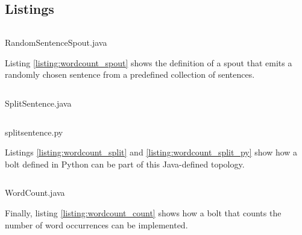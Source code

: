 \documentclass[bsc,logo,frontabs,twoside,singlespacing,normalheadings,parskip]{infthesis}\usepackage[]{graphicx}\usepackage[]{color}
\begin{document}
\begin{appendices}
\clearpage{}\chapter{Listings}
\label{ch:listings}

\begin{listing}[!htb]
\inputminted{java}{code/RandomSentenceSpout.java}
\caption{RandomSentenceSpout.java}
\label{listing:wordcount_spout}
\end{listing}

Listing \ref{listing:wordcount_spout} shows the definition of a spout that emits a randomly chosen sentence from a predefined collection of sentences.

\begin{listing}[!htb]
\inputminted{java}{code/SplitSentence.java}
\caption{SplitSentence.java}
\label{listing:wordcount_split}
\end{listing}

\begin{listing}[!htb]
\inputminted{python}{code/splitsentence.py}
\caption{splitsentence.py}
\label{listing:wordcount_split_py}
\end{listing}

Listings \ref{listing:wordcount_split} and \ref{listing:wordcount_split_py} show how a bolt defined in Python can be part of this Java-defined topology.

\begin{listing}[!htb]
\inputminted{java}{code/WordCount.java}
\caption{WordCount.java}
\label{listing:wordcount_count}
\end{listing}

Finally, listing \ref{listing:wordcount_count} shows how a bolt that counts the number of word occurrences can be implemented.

\clearpage{}
\end{appendices}



\end{document}
